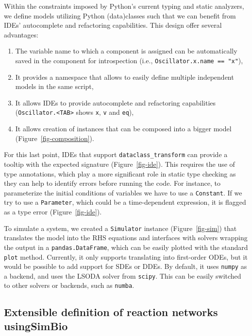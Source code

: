 \documentclass[namedate,numsec,webpdf,modern,large]{oup-authoring-template}
\theoremstyle{thmstyleone}%
\theoremstyle{thmstyletwo}%
\theoremstyle{thmstylethree}%
\begin{document}
Within the constraints imposed by Python's current typing and static analyzers,
we define models utilizing Python (data)classes
such that we can benefit from \acp{IDE}' autocomplete and refactoring capabilities.
This design offer several advantages:

\begin{enumerate}
\item
  The variable name to which a component is assigned can be automatically saved in the component for introspection
  (i.e., \texttt{Oscillator.x.name\ ==\ "x"}),
\item
  It provides a namespace that allows to easily define multiple independent models in the same script,
\item
  It allows \acp{IDE} to provide autocomplete and refactoring capabilities
  (\texttt{Oscillator.\textless{}TAB\textgreater{}} shows \texttt{x}, \texttt{v} and \texttt{eq}),
\item
  It allows creation of instances that can be composed into a bigger model (Figure~\ref{fig-composition}).
\end{enumerate}

For this last point,
\acp{IDE} that support \texttt{dataclass\_transform} \cite{debontePEP681Data2021}
can provide a tooltip with the expected signature (Figure~\ref{fig-ide}).
This requires the use of type annotations,
which play a more significant role in static type checking
as they can help to identify errors before running the code.
For instance, to parameterize the initial conditions of variables
we have to use a \texttt{Constant}.
If we try to use a \texttt{Parameter},
which could be a time-dependent expression,
it is flagged as a type error (Figure~\ref{fig-ide}).

To simulate a system,
we created a \texttt{Simulator} instance (Figure~\ref{fig-sim})
that translates the model into the \ac{RHS} equations
and interfaces with solvers
wrapping the output in a \texttt{pandas.DataFrame},
which can be easily plotted with the standard \texttt{plot} method.
Currently,
it only supports translating into first-order \acp{ODE},
but it would be possible to add support for \acp{SDE} or \acp{DDE}.
By default,
it uses \texttt{numpy} as a backend,
and uses the LSODA solver from \texttt{scipy}.
This can be easily switched to other solvers or backends, such as \texttt{numba}.

\subsection{Extensible definition of reaction networks usingSimBio}
\label{extensible-definition-of-reaction-networks-using-simbio}
\end{document}
